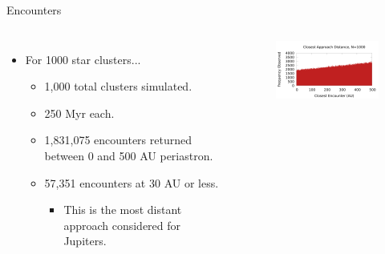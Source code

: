 \documentclass{beamer}
\begin{document}
\begin{frame}{Encounters}
    \begin{columns}
            \begin{itemize}
                \item For 1000 star clusters...
                    \begin{itemize}
                        \item 1,000 total clusters simulated.
                        \item 250 Myr each.
                        \item 1,831,075 encounters returned between 0 and 500 AU periastron.
                        \item 57,351 encounters at 30 AU or less.
                            \begin{itemize}
                                \item This is the most distant approach considered for Jupiters.
                            \end{itemize}
                    \end{itemize}
            \end{itemize}
            \begin{figure}
                \centering
                \includegraphics[width=2.25in]{slides/encounter_distance_1000}
            \end{figure}
    \end{columns}
\end{frame}
\end{document}
